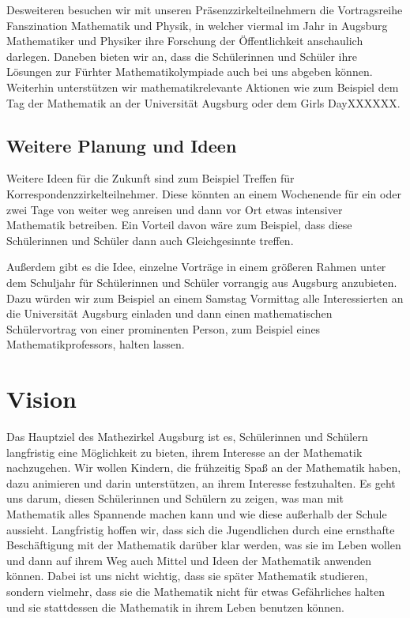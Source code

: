 \documentclass[12pt]{zettel}
\begin{document}
Desweiteren besuchen wir mit unseren Präsenzzirkelteilnehmern die
Vortragsreihe Fanszination Mathematik und Physik, in welcher viermal im
Jahr in Augsburg Mathematiker und Physiker ihre Forschung der
Öffentlichkeit anschaulich darlegen. Daneben bieten wir an, dass die
Schülerinnen und Schüler ihre Lösungen zur Fürhter Mathematikolympiade
auch bei uns abgeben können. Weiterhin unterstützen wir
mathematikrelevante Aktionen wie zum Beispiel dem Tag der Mathematik an
der Universität Augsburg oder dem Girls DayXXXXXX.

\subsection{Weitere Planung und Ideen}

Weitere Ideen für die Zukunft sind zum Beispiel Treffen für
Korrespondenzzirkelteilnehmer. Diese könnten an einem Wochenende für ein
oder zwei Tage von weiter weg anreisen und dann vor Ort etwas intensiver
Mathematik betreiben. Ein Vorteil davon wäre zum Beispiel, dass diese
Schülerinnen und Schüler dann auch Gleichgesinnte treffen.

Außerdem gibt es die Idee, einzelne Vorträge in einem größeren Rahmen
unter dem Schuljahr für Schülerinnen und Schüler vorrangig aus Augsburg
anzubieten. Dazu würden wir zum Beispiel an einem Samstag Vormittag alle
Interessierten an die Universität Augsburg einladen und dann einen
mathematischen Schülervortrag von einer prominenten Person, zum Beispiel
eines Mathematikprofessors, halten lassen.


\section{Vision}

Das Hauptziel des Mathezirkel Augsburg ist es, Schülerinnen und Schülern
langfristig eine Möglichkeit zu bieten, ihrem Interesse an der
Mathematik nachzugehen. Wir wollen Kindern, die frühzeitig Spaß an der
Mathematik haben, dazu animieren und darin unterstützen, an ihrem
Interesse festzuhalten. Es geht uns darum, diesen Schülerinnen und
Schülern zu zeigen, was man mit Mathematik alles Spannende machen kann
und wie diese außerhalb der Schule aussieht. Langfristig hoffen wir,
dass sich die Jugendlichen durch eine ernsthafte Beschäftigung mit der
Mathematik darüber klar werden, was sie im Leben wollen und dann auf
ihrem Weg auch Mittel und Ideen der Mathematik anwenden können. Dabei
ist uns nicht wichtig, dass sie später Mathematik studieren, sondern
vielmehr, dass sie die Mathematik nicht für etwas Gefährliches halten
und sie stattdessen die Mathematik in ihrem Leben benutzen können.
\end{document}
